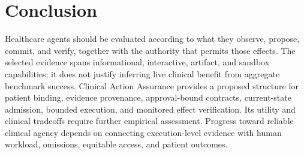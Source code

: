 \section{Conclusion}
Healthcare agents should be evaluated according to what they observe, propose, commit, and verify, together with the authority that permits those effects. The selected evidence spans informational, interactive, artifact, and sandbox capabilities; it does not justify inferring live clinical benefit from aggregate benchmark success. Clinical Action Assurance provides a proposed structure for patient binding, evidence provenance, approval-bound contracts, current-state admission, bounded execution, and monitored effect verification. Its utility and clinical tradeoffs require further empirical assessment. Progress toward reliable clinical agency depends on connecting execution-level evidence with human workload, omissions, equitable access, and patient outcomes.
